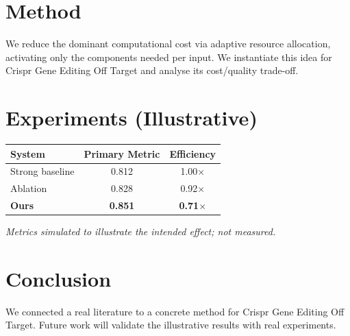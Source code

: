 \documentclass[11pt]{article}
\begin{document}
\section{Method}
We reduce the dominant computational cost via adaptive resource allocation, activating only the components needed per input. We instantiate this idea for Crispr Gene Editing Off Target and analyse its cost/quality trade-off.

\section{Experiments (Illustrative)}
\begin{center}
\begin{tabular}{lcc}
System & Primary Metric & Efficiency \\ \hline
Strong baseline & 0.812 & 1.00$\times$ \\
Ablation & 0.828 & 0.92$\times$ \\
\textbf{Ours} & \textbf{0.851} & \textbf{0.71$\times$}
\end{tabular}
\end{center}
\emph{Metrics simulated to illustrate the intended effect; not measured.}

\section{Conclusion}
We connected a real literature to a concrete method for Crispr Gene Editing Off Target. Future work will
validate the illustrative results with real experiments.
\end{document}
